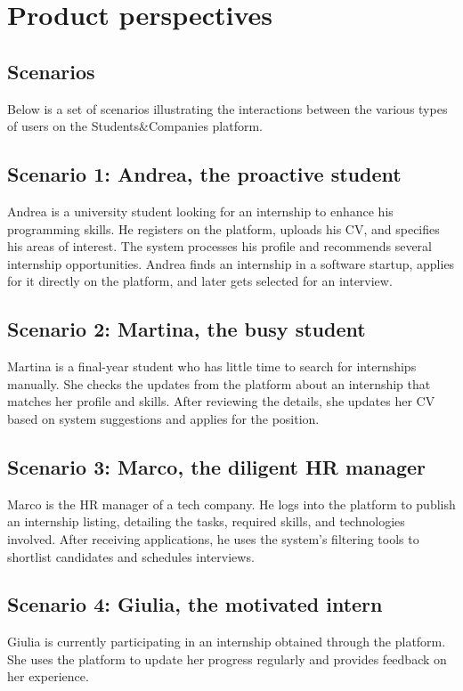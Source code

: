 \section{Product perspectives}\label{sec:product-perspectives}

\subsection{Scenarios}\label{subsec:scenarios}
Below is a set of scenarios illustrating the interactions between the various types of users on the Students\&Companies platform.

\subsection*{Scenario 1: Andrea, the proactive student}
Andrea is a university student looking for an internship to enhance his programming skills.
He registers on the platform, uploads his CV, and specifies his areas of interest.
The system processes his profile and recommends several internship opportunities.
Andrea finds an internship in a software startup, applies for it directly on the platform, and later gets selected for an interview.

\subsection*{Scenario 2: Martina, the busy student}
Martina is a final-year student who has little time to search for internships manually.
She checks the updates from the platform about an internship that matches her profile and skills.
After reviewing the details, she updates her CV based on system suggestions and applies for the position.

\subsection*{Scenario 3: Marco, the diligent HR manager}
Marco is the HR manager of a tech company.
He logs into the platform to publish an internship listing, detailing the tasks, required skills, and technologies involved.
After receiving applications, he uses the system's filtering tools to shortlist candidates and schedules interviews.

\subsection*{Scenario 4: Giulia, the motivated intern}
Giulia is currently participating in an internship obtained through the platform.
She uses the platform to update her progress regularly and provides feedback on her experience.

